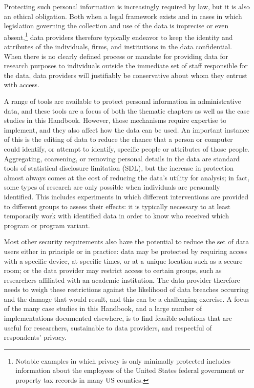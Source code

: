 \documentclass[
]{WileySix}
\begin{document}
Protecting such personal information is increasingly required by law, but it is also an ethical obligation. Both when a legal framework exists and in cases in which legislation governing the collection and use of the data is imprecise or even absent,\footnote{Notable examples in which privacy is only minimally protected includes information about the employees of the United States federal government or property tax records in many US counties.} data providers therefore typically endeavor to keep the identity and attributes of the individuals, firms, and institutions in the data confidential. When there is no clearly defined process or mandate for providing data for research purposes to individuals outside the immediate set of staff responsible for the data, data providers will justifiably be conservative about whom they entrust with access.

A range of tools are available to protect personal information in administrative data, and these tools are a focus of both the thematic chapters as well as the case studies in this Handbook. However, those mechanisms require expertise to implement, and they also affect how the data can be used. An important instance of this is the editing of data to reduce the chance that a person or computer could identify, or attempt to identify, specific people or attributes of those people. Aggregating, coarsening, or removing personal details in the data are standard tools of statistical disclosure limitation (SDL), but the increase in protection almost always comes at the cost of reducing the data's utility for analysis; in fact, some types of research are only possible when individuals are personally identified. This includes experiments in which different interventions are provided to different groups to assess their effects: it is typically necessary to at least temporarily work with identified data in order to know who received which program or program variant.

Most other security requirements also have the potential to reduce the set of data users either in principle or in practice: data may be protected by requiring access with a specific device, at specific times, or at a unique location such as a secure room; or the data provider may restrict access to certain groups, such as researchers affiliated with an academic institution. The data provider therefore needs to weigh these restrictions against the likelihood of data breaches occurring and the damage that would result, and this can be a challenging exercise. A focus of the many case studies in this Handbook, and a large number of implementations documented elsewhere, is to find feasible solutions that are useful for researchers, sustainable to data providers, and respectful of respondents' privacy.
\end{document}
